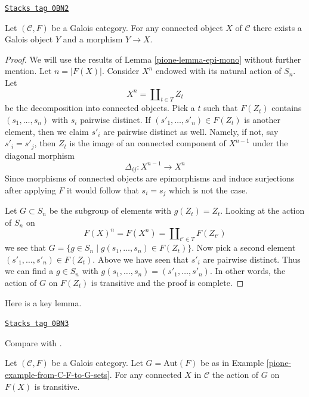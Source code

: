 \begin{lemma}[Galois]
\label{pione-lemma-galois}
\href{https://stacks.math.columbia.edu/tag/0BN2}{\texttt{Stacks tag 0BN2}}

Let $(\mathcal{C}, F)$ be a Galois category. For any connected object $X$
of $\mathcal{C}$ there exists a Galois object $Y$ and a morphism $Y \to X$.
\end{lemma}

\begin{proof}

We will use the results of Lemma \ref{pione-lemma-epi-mono} without further mention.
Let $n = |F(X)|$. Consider $X^n$ endowed with its natural action of
$S_n$. Let
$$
X^n = \coprod\nolimits_{t \in T} Z_t
$$
be the decomposition into connected objects. Pick a $t$ such that
$F(Z_t)$ contains $(s_1, \ldots, s_n)$ with $s_i$ pairwise distinct.
If $(s'_1, \ldots, s'_n) \in F(Z_t)$ is another element, then we
claim $s'_i$ are pairwise distinct as well. Namely, if not, say
$s'_i = s'_j$, then $Z_t$ is the image of an connected component of
$X^{n - 1}$ under the diagonal morphism
$$
\Delta_{ij} : X^{n - 1} \longrightarrow X^n
$$
Since morphisms of connected objects are epimorphisms and induce
surjections after applying $F$ it would follow that $s_i = s_j$
which is not the case.

\medskip\noindent
Let $G \subset S_n$ be the subgroup of elements with $g(Z_t) = Z_t$.
Looking at the action of $S_n$ on
$$
F(X)^n = F(X^n) = \coprod\nolimits_{t' \in T} F(Z_{t'})
$$
we see that $G = \{g \in S_n \mid g(s_1, \ldots, s_n) \in F(Z_t)\}$.
Now pick a second element $(s'_1, \ldots, s'_n) \in F(Z_t)$.
Above we have seen that $s'_i$ are pairwise distinct. Thus we can
find a $g \in S_n$ with $g(s_1, \ldots, s_n) = (s'_1, \ldots, s'_n)$.
In other words, the action of $G$ on $F(Z_t)$ is transitive and
the proof is complete.
\end{proof}

Here is a key lemma.

\begin{lemma}[Tame]
\label{pione-lemma-tame}
\href{https://stacks.math.columbia.edu/tag/0BN3}{\texttt{Stacks tag 0BN3}}

\begin{reference}
Compare with \cite[Definition 7.2.4]{BS}.
\end{reference}
Let $(\mathcal{C}, F)$ be a Galois category. Let $G = \text{Aut}(F)$
be as in Example \ref{pione-example-from-C-F-to-G-sets}. For any connected
$X$ in $\mathcal{C}$ the action of $G$ on $F(X)$ is transitive.
\end{lemma}

